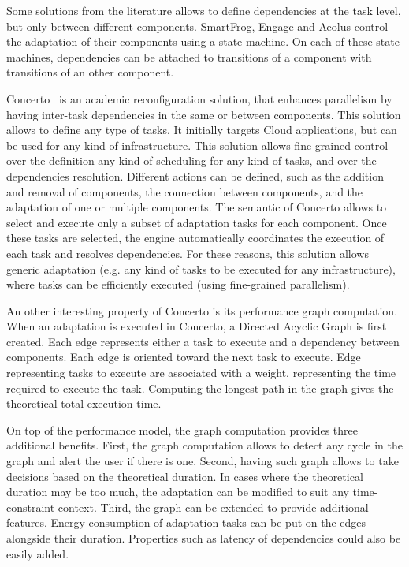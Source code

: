 \documentclass{article}
\begin{document}
Some solutions from the literature allows to define dependencies at the task level, but only between different components. SmartFrog, Engage and Aeolus control the adaptation of their components using a state-machine. On each of these state machines, dependencies can be attached to transitions of a component with transitions of an other component.

Concerto~\cite{chardet_toward_2021} is an academic reconfiguration solution, that enhances parallelism by having inter-task dependencies in the same or between components. This solution allows to define any type of tasks. It initially targets Cloud applications, but can be used for any kind of infrastructure. This solution allows fine-grained control over the definition any kind of scheduling for any kind of tasks, and over the dependencies resolution. Different actions can be defined, such as the addition and removal of components, the connection between components, and the adaptation of one or multiple components. The semantic of Concerto allows to select and execute only a subset of adaptation tasks for each component. Once these tasks are selected, the engine automatically coordinates the execution of each task and resolves dependencies. For these reasons, this solution allows generic adaptation (e.g. any kind of tasks to be executed for any infrastructure), where tasks can be efficiently executed (\ie using fine-grained parallelism).

An other interesting property of Concerto is its performance graph computation. When an adaptation is executed in Concerto, a Directed Acyclic Graph is first created. Each edge represents either a task to execute and a dependency between components. Each edge is oriented toward the next task to execute. Edge representing tasks to execute are associated with a weight, representing the time required to execute the task. Computing the longest path in the graph gives the theoretical total execution time.

On top of the performance model, the graph computation provides three additional benefits. First, the graph computation allows to detect any cycle in the graph and alert the user if there is one. Second, having such graph allows to take decisions based on the theoretical duration. In cases where the theoretical duration may be too much, the adaptation can be modified to suit any time-constraint context. Third, the graph can be extended to provide additional features. Energy consumption of adaptation tasks can be put on the edges alongside their duration. Properties such as latency of dependencies could also be easily added.
\end{document}
